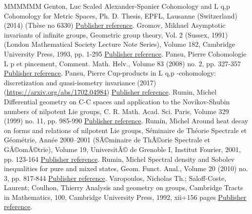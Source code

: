 \begin{thebibliography}{MMMMMM}
 Genton, Luc Scaled Alexander-Spanier Cohomology and L q,p  Cohomology for Metric Spaces, Ph. D. Thesis, EPFL, Lausanne (Switzerland) (2014) (Thèse no 6330) \href{https://ahl.centre-mersenne.org/item/AHL_2018__1__267_0/#Genton}{Publisher reference}.
 Gromov, Mikhael Asymptotic invariants of infinite groups, Geometric group theory, Vol. 2 (Sussex, 1991) (London Mathematical Society Lecture Note Series), Volume 182, Cambridge University Press, 1993, pp. 1-295 \href{https://ahl.centre-mersenne.org/item/AHL_2018__1__267_0/#Gromov}{Publisher reference}.
 Pansu, Pierre Cohomologie L p  et pincement, Comment. Math. Helv., Volume 83 (2008) no. 2, pp. 327-357 \href{https://ahl.centre-mersenne.org/item/AHL_2018__1__267_0/#Pansu4}{Publisher reference}.
 Pansu, Pierre Cup-products in L q,p -cohomology: discretization and quasi-isometry invariance (2017) (\url{https://arxiv.org/abs/1702.04984}) \href{https://ahl.centre-mersenne.org/item/AHL_2018__1__267_0/#Pansu2}{Publisher reference}.
 Rumin, Michel Differential geometry on C-C spaces and application to the Novikov-Shubin numbers of nilpotent Lie groups, C. R. Math. Acad. Sci. Paris, Volume 329 (1999) no. 11, pp. 985-990 \href{https://ahl.centre-mersenne.org/item/AHL_2018__1__267_0/#Rumin_CRAS_1999}{Publisher reference}.
 Rumin, Michel Around heat decay on forms and relations of nilpotent Lie groups, Séminaire de Théorie Spectrale et Géométrie, Année 2000–2001 (SÃ©minaire de ThÃ©orie Spectrale et GÃ©omÃ©trie), Volume 19, UniversitÃ© de Grenoble I, Institut Fourier, 2001, pp. 123-164 \href{https://ahl.centre-mersenne.org/item/AHL_2018__1__267_0/#Rumin_TSG}{Publisher reference}.
 Rumin, Michel Spectral density and Sobolev inequalities for pure and mixed states, Geom. Funct. Anal., Volume 20 (2010) no. 3, pp. 817-844 \href{https://ahl.centre-mersenne.org/item/AHL_2018__1__267_0/#Rumin10}{Publisher reference}.
 Varopoulos, Nicholas Th.; Saloff-Coste, Laurent; Coulhon, Thierry Analysis and geometry on groups, Cambridge Tracts in Mathematics, 100, Cambridge University Press, 1992, xii+156 pages \href{https://ahl.centre-mersenne.org/item/AHL_2018__1__267_0/#VCSC}{Publisher reference}.
\end{thebibliography}
